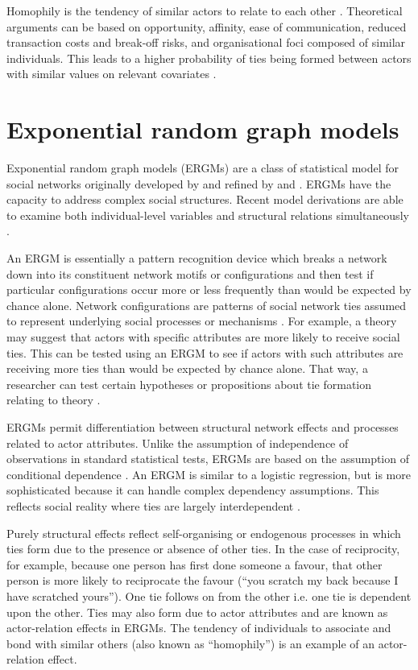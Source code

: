 Homophily is the tendency of similar actors to relate to each other \citep{mcpherson2001birds}. Theoretical arguments can be based on opportunity, affinity, ease of communication, reduced transaction costs and break-off risks, and organisational foci composed of similar individuals. This leads to a higher probability of ties being formed between actors with similar values on relevant covariates \citep{snijders2011statistical}. \medskip

\section{Exponential random graph models}

Exponential random graph models (ERGMs) are a class of statistical model for social networks originally developed by \citet{frank1986markov} and refined by \citet{wasserman1996logit} and \citet{pattison1999logit}. ERGMs have the capacity to address complex social structures. Recent model derivations are able to examine both individual-level variables and structural relations simultaneously \citep{robins2007recent}. \medskip

An ERGM is essentially a pattern recognition device which breaks a network down into its constituent network motifs or configurations and then test if particular configurations occur more or less frequently than would be expected by chance alone. Network configurations are patterns of social network ties assumed to represent underlying social processes or mechanisms \citep{lusher2014cooperative}. For example, a theory may suggest that actors with specific attributes are more likely to receive social ties. This can be tested using an ERGM to see if actors with such attributes are receiving more ties than would be expected by chance alone. That way, a researcher can test certain hypotheses or propositions about tie formation relating to theory \citep{robins2007recent}. \medskip

ERGMs permit differentiation between structural network effects and processes related to actor attributes. Unlike the assumption of independence of observations in standard statistical tests, ERGMs are based on the assumption of conditional dependence \citep{pattison2002neighborhood}. An ERGM is similar to a logistic regression, but is more sophisticated because it can handle complex dependency assumptions. This reflects social reality where ties are largely interdependent \citep{kadushin2012understanding}. \medskip

Purely structural effects reflect self-organising or endogenous processes in which ties form due to the presence or absence of other ties. In the case of reciprocity, for example, because one person has first done someone a favour, that other person is more likely to reciprocate the favour (\enquote{you scratch my back because I have scratched yours}). One tie follows on from the other i.e. one tie is dependent upon the other. Ties may also form due to actor attributes and are known as actor-relation effects in ERGMs. The tendency of individuals to associate and bond with similar others (also known as \enquote{homophily}) is an example of an actor-relation effect. \medskip 

